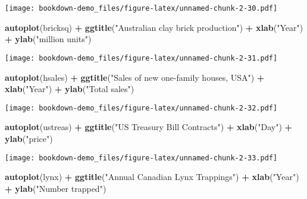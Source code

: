 \documentclass[]{book}
\newenvironment{Shaded}{\begin{snugshade}}{\end{snugshade}}
\newcommand{\KeywordTok}[1]{\textcolor[rgb]{0.13,0.29,0.53}{\textbf{#1}}}
\newcommand{\NormalTok}[1]{#1}
\newcommand{\OperatorTok}[1]{\textcolor[rgb]{0.81,0.36,0.00}{\textbf{#1}}}
\newcommand{\StringTok}[1]{\textcolor[rgb]{0.31,0.60,0.02}{#1}}
\begin{document}
\texttt{[image: bookdown-demo\_files/figure-latex/unnamed-chunk-2-30.pdf]}

\begin{Shaded}
\begin{Highlighting}[]
  \KeywordTok{autoplot}\NormalTok{(bricksq) }\OperatorTok{+}
\StringTok{    }\KeywordTok{ggtitle}\NormalTok{(}\StringTok{"Australian clay brick production"}\NormalTok{) }\OperatorTok{+}
\StringTok{    }\KeywordTok{xlab}\NormalTok{(}\StringTok{"Year"}\NormalTok{) }\OperatorTok{+}\StringTok{ }\KeywordTok{ylab}\NormalTok{(}\StringTok{"million units"}\NormalTok{)}
\end{Highlighting}
\end{Shaded}

\texttt{[image: bookdown-demo\_files/figure-latex/unnamed-chunk-2-31.pdf]}

\begin{Shaded}
\begin{Highlighting}[]
  \KeywordTok{autoplot}\NormalTok{(hsales) }\OperatorTok{+}
\StringTok{    }\KeywordTok{ggtitle}\NormalTok{(}\StringTok{"Sales of new one-family houses, USA"}\NormalTok{) }\OperatorTok{+}
\StringTok{    }\KeywordTok{xlab}\NormalTok{(}\StringTok{"Year"}\NormalTok{) }\OperatorTok{+}\StringTok{ }\KeywordTok{ylab}\NormalTok{(}\StringTok{"Total sales"}\NormalTok{)}
\end{Highlighting}
\end{Shaded}

\texttt{[image: bookdown-demo\_files/figure-latex/unnamed-chunk-2-32.pdf]}

\begin{Shaded}
\begin{Highlighting}[]
  \KeywordTok{autoplot}\NormalTok{(ustreas) }\OperatorTok{+}
\StringTok{    }\KeywordTok{ggtitle}\NormalTok{(}\StringTok{"US Treasury Bill Contracts"}\NormalTok{) }\OperatorTok{+}
\StringTok{    }\KeywordTok{xlab}\NormalTok{(}\StringTok{"Day"}\NormalTok{) }\OperatorTok{+}\StringTok{ }\KeywordTok{ylab}\NormalTok{(}\StringTok{"price"}\NormalTok{)}
\end{Highlighting}
\end{Shaded}

\texttt{[image: bookdown-demo\_files/figure-latex/unnamed-chunk-2-33.pdf]}

\begin{Shaded}
\begin{Highlighting}[]
  \KeywordTok{autoplot}\NormalTok{(lynx) }\OperatorTok{+}
\StringTok{    }\KeywordTok{ggtitle}\NormalTok{(}\StringTok{"Annual Canadian Lynx Trappings"}\NormalTok{) }\OperatorTok{+}
\StringTok{    }\KeywordTok{xlab}\NormalTok{(}\StringTok{"Year"}\NormalTok{) }\OperatorTok{+}\StringTok{ }\KeywordTok{ylab}\NormalTok{(}\StringTok{"Number trapped"}\NormalTok{)}
\end{Highlighting}
\end{Shaded}
\end{document}
